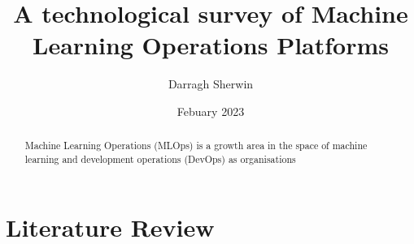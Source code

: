 \documentclass[12pt, letterpaper]{article}
\title{A technological survey of Machine Learning Operations Platforms}
\author{Darragh Sherwin}
\date{Febuary 2023}
\begin{document}
\maketitle
\begin{abstract}
Machine Learning Operations (MLOps) is a growth area in the space of machine learning and development operations (DevOps) as organisations 
\end{abstract}

\section{Literature Review}
\end{document}
